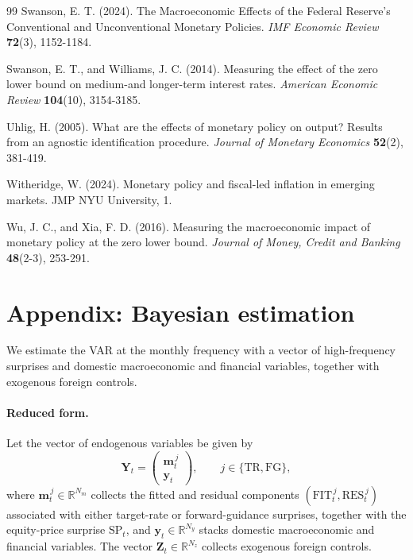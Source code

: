\documentclass[12pt, reqno]{article}
\begin{document}
\begin{thebibliography}{99}
\bibitem{} \hypertarget{Swanson (2024)}{} 
Swanson, E. T. (2024). The Macroeconomic Effects of the Federal Reserve’s Conventional and Unconventional Monetary Policies. \textit{IMF Economic Review} \textbf{72}(3), 1152-1184.

\bibitem{} \hypertarget{Swanson and Williams (2014)}{} Swanson, E. T., and Williams, J. C. (2014). Measuring the effect of the zero lower bound on medium-and longer-term interest rates. \textit{American Economic Review} \textbf{104}(10), 3154-3185.

\bibitem{} \hypertarget{Uhlig (2005)}{} Uhlig, H. (2005). What are the effects of monetary policy on output? Results from an agnostic identification procedure. \textit{Journal of Monetary Economics} \textbf{52}(2), 381-419.

\bibitem{} \hypertarget{Witheridge (2024)}{} 
Witheridge, W. (2024). Monetary policy and fiscal-led inflation in emerging markets. JMP NYU University, 1.

\bibitem{} \hypertarget{Wu and Xia (2016)}{} Wu, J. C., and Xia, F. D. (2016). Measuring the macroeconomic impact of monetary policy at the zero lower bound. \textit{Journal of Money, Credit and Banking} \textbf{48}(2-3), 253-291.

\end{thebibliography}
\newpage

\appendix

\section{Appendix: Bayesian estimation}
\setcounter{equation}{0}
\hypertarget{Appendix A}{}

We estimate the VAR at the monthly frequency with a vector of high-frequency surprises and domestic macroeconomic and financial variables, together with exogenous foreign controls.

\paragraph{Reduced form.}
Let the vector of endogenous variables be given by
\[
\boldsymbol{Y}_t =
\begin{pmatrix}
\boldsymbol{m}_t^{\,j} \\
\boldsymbol{y}_t
\end{pmatrix},
\qquad j \in \{\text{TR}, \text{FG}\},
\]
where $\boldsymbol{m}_t^{\,j} \in \mathbb{R}^{N_m}$ collects the fitted and residual components $(\text{FIT}_t^{\,j}, \text{RES}_t^{\,j})$ associated with either target-rate or forward-guidance surprises, together with the equity-price surprise $\text{SP}_t$, and $\boldsymbol{y}_t \in \mathbb{R}^{N_y}$ stacks domestic macroeconomic and financial variables. The vector $\boldsymbol{Z}_t \in \mathbb{R}^{N_z}$ collects exogenous foreign controls.
\end{document}
